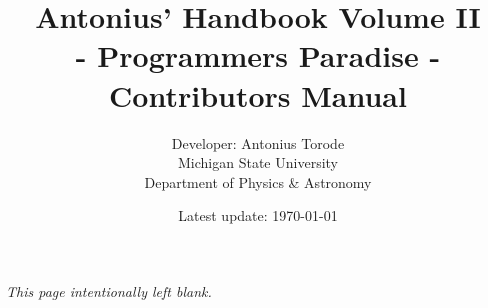 \documentclass[openany,a4paper,11pt]{book}
\title{Antonius' Handbook Volume II \\ - Programmers Paradise - \\  Contributors Manual}
\author{Developer: Antonius Torode \\ Michigan State University \\ Department of Physics \& Astronomy}
\date{Latest update: \today}
\begin{document}
\frontmatter
\maketitle

\tableofcontents
\newpage
\vspace*{\fill}
\begin{center}
	\textit{This page intentionally left blank.}
\end{center}
\vspace*{\fill}

\mainmatter
\pagestyle{fancy}
\fancyhf{}
\fancyhead[RO, LE]{\thepage}





\backmatter
\end{document}
